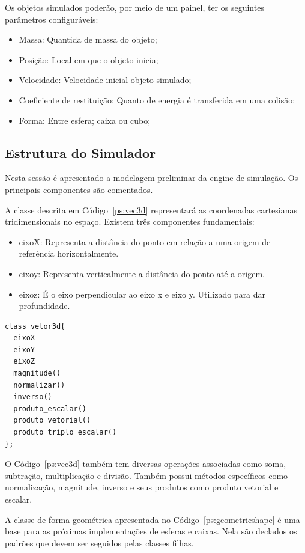 Os objetos simulados poderão, por meio de um painel, ter os seguintes parâmetros configuráveis: 
\begin{itemize}
\item Massa: Quantida de massa do objeto; 
\item Posição: Local em que o objeto inicia;
\item Velocidade: Velocidade inicial objeto simulado; 
\item Coeficiente de restituição: Quanto de energia é transferida em uma colisão;
\item Forma: Entre esfera; caixa ou cubo; 
\end{itemize}

\subsection{Estrutura do Simulador}
Nesta sessão é apresentado a modelagem preliminar da engine de simulação. Os principais componentes são comentados. 

A classe descrita em Código~\ref{ps:vec3d} representará as coordenadas cartesianas tridimensionais no espaço.
Existem três componentes fundamentais:
\begin{itemize}
  \item eixoX: Representa a distância do ponto em relação a uma origem de referência horizontalmente.
  \item eixoy: Representa verticalmente a distância do ponto até a origem.
  \item eixoz: É o eixo perpendicular ao eixo x e eixo y. Utilizado para dar profundidade.
\end{itemize}

\begin{lstlisting}[frame=single,caption=Modelagem prévia para vetor3d\label{ps:vec3d}]
class vetor3d{
  eixoX
  eixoY
  eixoZ
  magnitude()
  normalizar()
  inverso()
  produto_escalar()
  produto_vetorial()
  produto_triplo_escalar()
};
\end{lstlisting}

O Código~\ref{ps:vec3d} também tem diversas operações associadas como soma, subtração,
multiplicação e divisão. Também possui métodos específicos como normalização,
magnitude, inverso e seus produtos como produto vetorial e escalar.


A classe de forma geométrica apresentada no Código~\ref{ps:geometricshape} é uma base para as próximas implementações de
esferas e caixas. Nela são declados os padrões que devem ser seguidos pelas classes filhas.

